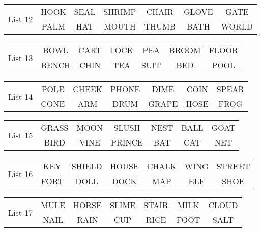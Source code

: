 \documentclass{article}
\begin{document}
\vspace{.1in}
\hspace{.5in}\begin{tabular}{r||c c c c c c }
\multirow{2}{*}{List 12} & HOOK & SEAL & SHRIMP & CHAIR & GLOVE & GATE\\
\cline{2-7}			& PALM & HAT & MOUTH & THUMB & BATH & WORLD\\
\end{tabular}

\vspace{.1in}
\hspace{.5in}\begin{tabular}{r||c c c c c c }
\multirow{2}{*}{List 13} & BOWL & CART & LOCK & PEA & BROOM & FLOOR\\
\cline{2-7}			& BENCH & CHIN & TEA & SUIT & BED & POOL\\
\end{tabular}

\vspace{.1in}
\hspace{.5in}\begin{tabular}{r||c c c c c c }
\multirow{2}{*}{List 14} & POLE & CHEEK & PHONE & DIME & COIN & SPEAR\\
\cline{2-7}			& CONE & ARM & DRUM & GRAPE & HOSE & FROG\\
\end{tabular}

\vspace{.1in}
\hspace{.5in}\begin{tabular}{r||c c c c c c }
\multirow{2}{*}{List 15} & GRASS & MOON & SLUSH & NEST & BALL & GOAT\\
\cline{2-7}			& BIRD & VINE & PRINCE & BAT & CAT & NET\\
\end{tabular}

\vspace{.1in}
\hspace{.5in}\begin{tabular}{r||c c c c c c }
\multirow{2}{*}{List 16} & KEY & SHIELD & HOUSE & CHALK & WING & STREET\\
\cline{2-7}			& FORT & DOLL & DOCK & MAP & ELF & SHOE\\
\end{tabular}

\vspace{.1in}
\hspace{.5in}\begin{tabular}{r||c c c c c c }
\multirow{2}{*}{List 17} & MULE & HORSE & SLIME & STAIR & MILK & CLOUD\\
\cline{2-7}			& NAIL & RAIN & CUP & RICE & FOOT & SALT\\
\end{tabular}
\end{document}
